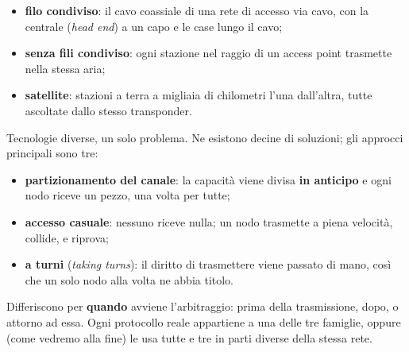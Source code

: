 \begin{itemize}
    \item \textbf{filo condiviso}: il cavo coassiale di una rete di accesso via cavo, con la centrale (\emph{head end}) a un capo e le
          case lungo il cavo;
    \item \textbf{senza fili condiviso}: ogni stazione nel raggio di un access point trasmette nella stessa aria;
    \item \textbf{satellite}: stazioni a terra a migliaia di chilometri l'una dall'altra, tutte ascoltate dallo stesso transponder.
\end{itemize}

Tecnologie diverse, un solo problema. Ne esistono decine di soluzioni; gli approcci principali sono tre:

\begin{itemize}
    \item \textbf{partizionamento del canale}: la capacità viene divisa \textbf{in anticipo} e ogni nodo riceve un pezzo, una volta per
          tutte;
    \item \textbf{accesso casuale}: nessuno riceve nulla; un nodo trasmette a piena velocità, collide, e riprova;
    \item \textbf{a turni} (\emph{taking turns}): il diritto di trasmettere viene passato di mano, così che un solo nodo alla volta ne
          abbia titolo.
\end{itemize}

Differiscono per \textbf{quando} avviene l'arbitraggio: prima della trasmissione, dopo, o attorno ad essa. Ogni protocollo reale
appartiene a una delle tre famiglie, oppure (come vedremo alla fine) le usa tutte e tre in parti diverse della stessa rete.


